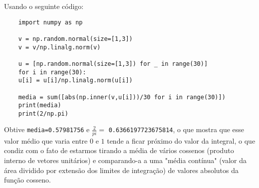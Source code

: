 \documentclass[leqno]{article}
\begin{document}
\begin{enumerate}
    Usando o seguinte código:
    
    \begin{verbatim}
    import numpy as np

    v = np.random.normal(size=[1,3])
    v = v/np.linalg.norm(v)

    u = [np.random.normal(size=[1,3]) for _ in range(30)]
    for i in range(30):
    u[i] = u[i]/np.linalg.norm(u[i])

    media = sum([abs(np.inner(v,u[i]))/30 for i in range(30)])
    print(media)
    print(2/np.pi)
    \end{verbatim}
    
    Obtive \texttt{media=0.57981756} e $\frac{2}{pi}=$ \texttt{0.6366197723675814}, o que mostra que esse valor médio que varia entre $0$ e $1$ tende a ficar próximo do valor da integral, o que condiz com o fato de estarmos tirando a média de vários cossenos (produto interno de vetores unitários) e comparando-a a uma "média contínua" (valor da área dividido por extensão dos limites de integração) de valores absolutos da função cosseno.
    
\end{enumerate}

 
\end{document}
